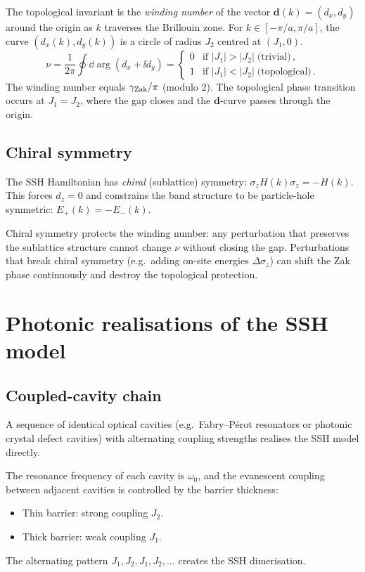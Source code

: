 The topological invariant is the \emph{winding number} of the vector
$\mathbf{d}(k)=(d_x,d_y)$ around the origin as $k$ traverses the
Brillouin zone.  For $k\in[-\pi/a,\pi/a]$, the curve
$(d_x(k),d_y(k))$ is a circle of radius $J_2$ centred at $(J_1,0)$.
\begin{equation}\label{eq:ch14-winding}
  \nu = \frac{1}{2\pi}\oint\dd\arg(d_x+\ii d_y)
  = \begin{cases} 0 & \text{if }|J_1|>|J_2|\;\text{(trivial)}\,,\\
  1 & \text{if }|J_1|<|J_2|\;\text{(topological)}\,.\end{cases}
\end{equation}
The winding number equals $\gamma_{\mathrm{Zak}}/\pi$ (modulo 2).  The topological phase
transition occurs at $J_1=J_2$, where the gap closes and the
$\mathbf{d}$-curve passes through the origin.

\subsection{Chiral symmetry}
\label{sec:ch14-chiral}

The SSH Hamiltonian has \emph{chiral} (sublattice) symmetry:
$\sigma_z H(k)\sigma_z=-H(k)$.  This forces $d_z=0$ and constrains
the band structure to be particle-hole symmetric: $E_+(k)=-E_-(k)$.

Chiral symmetry protects the winding number: any perturbation that
preserves the sublattice structure cannot change $\nu$ without closing
the gap.  Perturbations that break chiral symmetry (e.g.\ adding
on-site energies $\Delta\sigma_z$) can shift the Zak phase continuously
and destroy the topological protection.

\section{Photonic realisations of the SSH model}
\label{sec:ch14-ssh-photonic}

\subsection{Coupled-cavity chain}
\label{sec:ch14-coupled-cavity}

A sequence of identical optical cavities (e.g.\ Fabry--P\'erot
resonators or photonic crystal defect cavities) with alternating
coupling strengths realises the SSH model directly.

The resonance frequency of each cavity is $\omega_0$, and the
evanescent coupling between adjacent cavities is controlled by the
barrier thickness:
\begin{itemize}
  \item Thin barrier: strong coupling $J_2$.
  \item Thick barrier: weak coupling $J_1$.
\end{itemize}
The alternating pattern $J_1,J_2,J_1,J_2,\ldots$ creates the SSH
dimerisation.

